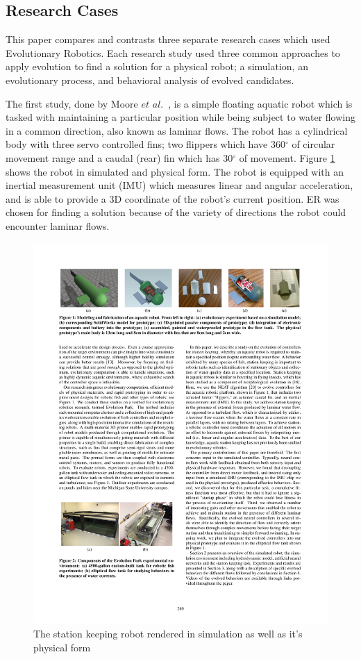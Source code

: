 \documentclass{sig-alternate}
\begin{document}
  
  \subsection{Research Cases}
	This paper compares and contrasts three separate research cases which used Evolutionary Robotics. Each research study used three common approaches to apply evolution to find a solution for a physical robot; a simulation, an evolutionary process, and behavioral analysis of evolved candidates.
	
	The first study, done by Moore $et$ $al.$~\cite{Moore:2013:ESK:2463372.2463402}, is a simple floating aquatic robot which is tasked with maintaining a particular position while being subject to water flowing in a common direction, also known as laminar flows. The robot has a cylindrical body with three servo controlled fins; two flippers which have 360$^\circ$ of circular movement range and a caudal (rear) fin which has 30$^\circ$ of movement. Figure \ref{fig:sRobot} shows the robot in simulated and physical form. The robot is equipped with an inertial measurement unit (IMU) which measures linear and angular acceleration, and is able to provide a 3D coordinate of the robot's current position. ER was chosen for finding a solution because of the variety of directions the robot could encounter laminar flows.

\begin{figure}%
\center
  \includegraphics[scale=1]{sr2}
\caption{The station keeping robot rendered in simulation as well as it's physical form}
\label{fig:sRobot}
\end{figure}
\end{document}
